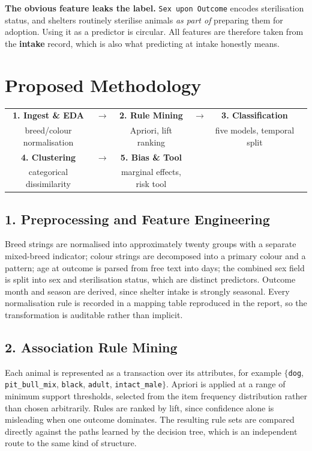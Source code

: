 \documentclass[11pt,a4paper]{article}
\begin{document}
\textbf{The obvious feature leaks the label.} \texttt{Sex upon Outcome} encodes
sterilisation status, and shelters routinely sterilise animals \emph{as part of}
preparing them for adoption. Using it as a predictor is circular. All features are
therefore taken from the \textbf{intake} record, which is also what predicting at
intake honestly means.

\section*{Proposed Methodology}

\begin{center}
\small
\begin{tabular}{@{}cccccc@{}}
\toprule
\textbf{1. Ingest \& EDA} & $\rightarrow$ & \textbf{2. Rule Mining} & $\rightarrow$ &
\textbf{3. Classification} & \\
breed/colour normalisation & & Apriori, lift ranking & & five models, temporal split & \\
\midrule
\textbf{4. Clustering} & $\rightarrow$ & \textbf{5. Bias \& Tool} & & & \\
categorical dissimilarity & & marginal effects, risk tool & & & \\
\bottomrule
\end{tabular}
\end{center}

\subsection*{1. Preprocessing and Feature Engineering}
Breed strings are normalised into approximately twenty groups with a separate
mixed-breed indicator; colour strings are decomposed into a primary colour and a
pattern; age at outcome is parsed from free text into days; the combined sex field is
split into sex and sterilisation status, which are distinct predictors. Outcome month
and season are derived, since shelter intake is strongly seasonal. Every normalisation
rule is recorded in a mapping table reproduced in the report, so the transformation is
auditable rather than implicit.

\subsection*{2. Association Rule Mining}
Each animal is represented as a transaction over its attributes, for example
$\{$\texttt{dog}, \texttt{pit\_bull\_mix}, \texttt{black}, \texttt{adult},
\texttt{intact\_male}$\}$. Apriori is applied at a range of minimum support
thresholds, selected from the item frequency distribution rather than chosen
arbitrarily. Rules are ranked by lift, since confidence alone is misleading when one
outcome dominates. The resulting rule sets are compared directly against the paths
learned by the decision tree, which is an independent route to the same kind of
structure.
\end{document}
